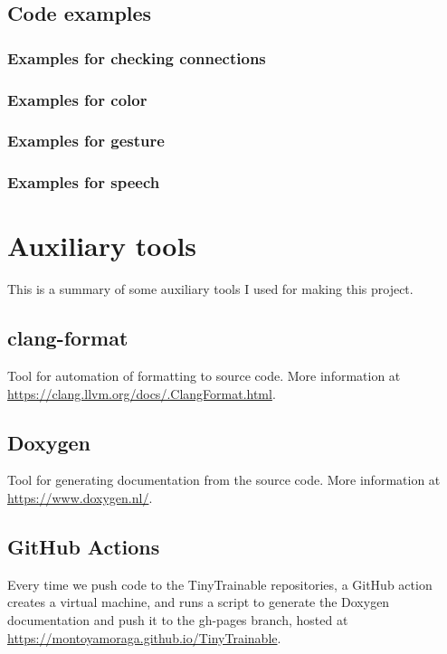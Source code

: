 \subsection{Code examples}

\subsubsection{Examples for checking connections}

\subsubsection{Examples for color}

\subsubsection{Examples for gesture}

\subsubsection{Examples for speech}

\section{Auxiliary tools}

This is a summary of some auxiliary tools I used for making this project.

\subsection{clang-format}

Tool for automation of formatting to source code. More information at \url{https://clang.llvm.org/docs/.ClangFormat.html}.

\subsection{Doxygen}

Tool for generating documentation from the source code. More information at \url{https://www.doxygen.nl/}.

\subsection{GitHub Actions}

Every time we push code to the TinyTrainable repositories, a GitHub action creates a virtual machine, and runs a script to generate the Doxygen documentation and push it to the gh-pages branch, hosted at \url{https://montoyamoraga.github.io/TinyTrainable}.

